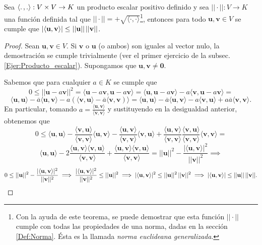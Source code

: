 \documentclass[12pt,dvipsnames]{article}
\newenvironment{teorema}[2][Teorema]{\begin{trivlist}
\item[\hskip \labelsep {\bfseries #1}\hskip \labelsep {\bfseries #2.}]}{\end{trivlist}}
\begin{document}
\begin{teorema} {2.2.3.1} 

    Sea $\langle.\hspace{0.5mm},.\rangle:V\times V\rightarrow K$ un producto escalar positivo definido y sea $||\cdot ||:V\rightarrow K$ una función definida tal que $||\cdot||=+\sqrt{\langle\cdot,\cdot\rangle}$\footnote{Con la ayuda de este teorema, se puede demostrar que esta función $||\cdot ||$ cumple con todas las propiedades de una norma, dadas en la sección \ref{Def:Norma}. Ésta es la llamada \emph{norma euclideana generalizada}.}, entonces para todo $\mathbf{u},\mathbf{v}\in V$ se cumple que $|\langle\mathbf{u},\mathbf{v}\rangle|\leq ||\mathbf{u}||\hspace{0.5mm}||\mathbf{v}||$.

\begin{proof}
    Sean $\mathbf{u},\mathbf{v}\in V.$ Si $\mathbf{v}$ o $\mathbf{u}$ (o ambos) son iguales al vector nulo, la demostración se cumple trivialmente (ver el primer ejercicio de la subsec. \ref{Ejer:Producto_escalar}). Supongamos que $\mathbf{u},\mathbf{v}\neq\mathbf{0}$. 

    Sabemos que para cualquier $a\in K$ se cumple que $$0\leq ||\mathbf{u}-a\mathbf{v}||^2 = \langle\mathbf{u}-a\mathbf{v},\mathbf{u}-a\mathbf{v}\rangle= \langle\mathbf{u},\mathbf{u}-a\mathbf{v}\rangle-a\langle\mathbf{v},\mathbf{u}-a\mathbf{v}\rangle=$$ $$\langle\mathbf{u},\mathbf{u}\rangle-\overline{a}\langle\mathbf{u},\mathbf{v}\rangle-a(\langle\mathbf{v},\mathbf{u}\rangle-\overline{a}\langle\mathbf{v},\mathbf{v})\rangle=\langle\mathbf{u},\mathbf{u}\rangle-\overline{a}\langle\mathbf{u},\mathbf{v}\rangle-a\langle\mathbf{v},\mathbf{u}\rangle+a\overline{a}\langle\mathbf{v},\mathbf{v}\rangle.$$ \noindent En particular, tomando $a=\frac{\langle\mathbf{u},\mathbf{v}\rangle}{\langle\mathbf{v},\mathbf{v}\rangle}$ y sustituyendo en la desigualdad anterior, obtenemos que $$0\leq\langle\mathbf{u},\mathbf{u}\rangle-\frac{\langle\mathbf{v},\mathbf{u}\rangle}{\langle\mathbf{v},\mathbf{v}\rangle}\langle\mathbf{u},\mathbf{v}\rangle-\frac{\langle\mathbf{u},\mathbf{v}\rangle}{\langle\mathbf{v},\mathbf{v}\rangle}\langle\mathbf{v},\mathbf{u}\rangle+\frac{\langle\mathbf{u},\mathbf{v}\rangle}{\langle\mathbf{v},\mathbf{v}\rangle}\frac{\langle\mathbf{v},\mathbf{u}\rangle}{\langle\mathbf{v},\mathbf{v}\rangle}\langle\mathbf{v},\mathbf{v}\rangle=$$ $$\langle\mathbf{u},\mathbf{u}\rangle-2\frac{\langle\mathbf{u},\mathbf{v}\rangle\langle\mathbf{v},\mathbf{u}\rangle}{\langle\mathbf{v},\mathbf{v}\rangle}+\frac{\langle\mathbf{u},\mathbf{v}\rangle\langle\mathbf{v},\mathbf{u}\rangle}{\langle\mathbf{v},\mathbf{v}\rangle}=||\mathbf{u}||^2-\frac{|\langle\mathbf{u},\mathbf{v}\rangle|^2}{||\mathbf{v}||^2}\implies$$ $$0\leq ||\mathbf{u}||^2-\frac{|\langle\mathbf{u},\mathbf{v}\rangle|^2}{||\mathbf{v}||^2}\implies \frac{|\langle\mathbf{u},\mathbf{v}\rangle|^2}{||\mathbf{v}||^2}\leq ||\mathbf{u}||^2\implies|\langle\mathbf{u},\mathbf{v}\rangle|^2\leq ||\mathbf{u}||^2\hspace{0.5mm}||\mathbf{v}||^2\implies|\langle\mathbf{u},\mathbf{v}\rangle|\leq ||\mathbf{u}||\hspace{0.5mm}||\mathbf{v}||.$$


\end{proof}
\end{teorema}
\end{document}
